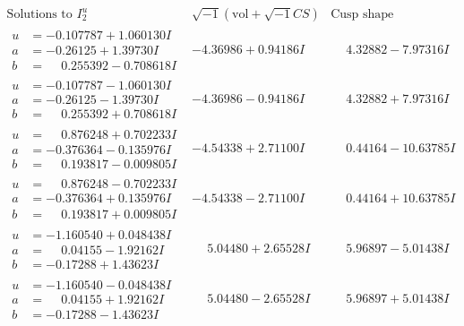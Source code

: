 \documentclass[1p]{elsarticle_modified}
\theoremstyle{definition}
\newcommand{\I}{\sqrt{-1}}
\begin{document}
$$\begin{array}{c|c|c}  
\text{Solutions to }I^u_{2}& \I (\text{vol} + \sqrt{-1}CS) & \text{Cusp shape}\\
 \hline 
\begin{aligned}
u &= -0.107787 + 1.060130 I \\
a &= -0.26125 + 1.39730 I \\
b &= \phantom{-}0.255392 - 0.708618 I\end{aligned}
 & -4.36986 + 0.94186 I & \phantom{-}4.32882 - 7.97316 I \\ \hline\begin{aligned}
u &= -0.107787 - 1.060130 I \\
a &= -0.26125 - 1.39730 I \\
b &= \phantom{-}0.255392 + 0.708618 I\end{aligned}
 & -4.36986 - 0.94186 I & \phantom{-}4.32882 + 7.97316 I \\ \hline\begin{aligned}
u &= \phantom{-}0.876248 + 0.702233 I \\
a &= -0.376364 - 0.135976 I \\
b &= \phantom{-}0.193817 - 0.009805 I\end{aligned}
 & -4.54338 + 2.71100 I & \phantom{-}0.44164 - 10.63785 I \\ \hline\begin{aligned}
u &= \phantom{-}0.876248 - 0.702233 I \\
a &= -0.376364 + 0.135976 I \\
b &= \phantom{-}0.193817 + 0.009805 I\end{aligned}
 & -4.54338 - 2.71100 I & \phantom{-}0.44164 + 10.63785 I \\ \hline\begin{aligned}
u &= -1.160540 + 0.048438 I \\
a &= \phantom{-}0.04155 - 1.92162 I \\
b &= -0.17288 + 1.43623 I\end{aligned}
 & \phantom{-}5.04480 + 2.65528 I & \phantom{-}5.96897 - 5.01438 I \\ \hline\begin{aligned}
u &= -1.160540 - 0.048438 I \\
a &= \phantom{-}0.04155 + 1.92162 I \\
b &= -0.17288 - 1.43623 I\end{aligned}
 & \phantom{-}5.04480 - 2.65528 I & \phantom{-}5.96897 + 5.01438 I \\ \hline\begin{aligned}

\end{aligned}
\end{array}$$
\end{document}
